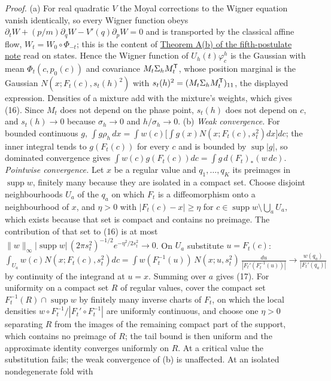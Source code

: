 \documentclass[11pt,a4paper]{article}
\begin{document}
\emph{Proof.} (a) For real quadratic \(V\) the Moyal corrections to the
Wigner equation vanish identically, so every Wigner function obeys
\(\partial_tW+(p/m)\partial_qW-V'(q)\partial_pW=0\) and is transported
by the classical affine flow, \(W_t=W_0\circ\Phi_{-t}\); this is the
content of \href{principia-fifth-postulate.md}{Theorem A(b) of the
fifth-postulate note} read on states. Hence the Wigner function of
\(U_h(t)\varphi^h_c\) is the Gaussian with mean \(\Phi_t(c,p_0(c))\) and
covariance \(M_t\Sigma_hM_t^{\sf T}\), whose position marginal is the
Gaussian \(N(x;F_t(c),s_t(h)^2)\) with
\(s_t(h)^2=(M_t\Sigma_hM_t^{\sf T})_{11}\), the displayed expression.
Densities of a mixture add with the mixture's weights, which gives (16).
Since \(M_t\) does not depend on the phase point, \(s_t(h)\) does not
depend on \(c\), and \(s_t(h)\to0\) because \(\sigma_h\to0\) and
\(h/\sigma_h\to0\). (b) \emph{Weak convergence.} For bounded continuous
\(g\),
\(\int g\rho_h\,dx=\int w(c)\big[\int g(x)N(x;F_t(c),s_t^2)dx\big]dc\);
the inner integral tends to \(g(F_t(c))\) for every \(c\) and is bounded
by \(\sup|g|\), so dominated convergence gives
\(\int w(c)g(F_t(c))dc=\int g\,d(F_t)_*(w\,dc)\). \emph{Pointwise
convergence.} Let \(x\) be a regular value and \(q_1,\ldots,q_K\) its
preimages in \(\operatorname{supp}w\), finitely many because they are
isolated in a compact set. Choose disjoint neighbourhoods \(U_a\) of the
\(q_a\) on which \(F_t\) is a diffeomorphism onto a neighbourhood of
\(x\), and \(\eta>0\) with \(|F_t(c)-x|\ge\eta\) for
\(c\in\operatorname{supp}w\setminus\bigcup_aU_a\), which exists because
that set is compact and contains no preimage. The contribution of that
set to (16) is at most
\(\|w\|_\infty|\operatorname{supp}w|\,(2\pi s_t^2)^{-1/2}e^{-\eta^2/2s_t^2}\to0\).
On \(U_a\) substitute \(u=F_t(c)\):
\(\int_{U_a}w(c)N(x;F_t(c),s_t^2)dc=\int w(F_t^{-1}(u))\,N(x;u,s_t^2)\, \frac{du}{|F_t'(F_t^{-1}(u))|}\to\frac{w(q_a)}{|F_t'(q_a)|}\)
by continuity of the integrand at \(u=x\). Summing over \(a\) gives
(17). For uniformity on a compact set \(R\) of regular values, cover the
compact set \(F_t^{-1}(R)\cap\operatorname{supp}w\) by finitely many
inverse charts of \(F_t\), on which the local densities
\(w\circ F_t^{-1}/|F_t'\circ F_t^{-1}|\) are uniformly continuous, and
choose one \(\eta>0\) separating \(R\) from the images of the remaining
compact part of the support, which contains no preimage of \(R\); the
tail bound is then uniform and the approximate identity converges
uniformly on \(R\). At a critical value the substitution fails; the weak
convergence of (b) is unaffected. At an isolated nondegenerate fold with
\end{document}
